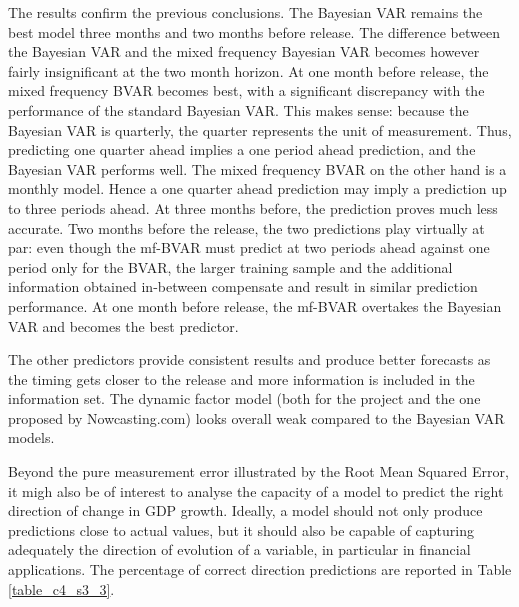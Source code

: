 The results confirm the previous conclusions. The Bayesian VAR remains the best model three months and two months before release. The difference between the Bayesian VAR and the mixed frequency Bayesian VAR becomes however fairly insignificant at the two month horizon. At one month before release, the mixed frequency BVAR becomes best, with a significant discrepancy with the performance of the standard Bayesian VAR. This makes sense: because the Bayesian VAR is quarterly, the quarter represents the unit of measurement. Thus, predicting one quarter ahead implies a one period ahead prediction, and the Bayesian VAR performs well. The mixed frequency BVAR on the other hand is a monthly model. Hence a one quarter ahead prediction may imply a prediction up to three periods ahead. At three months before, the prediction proves much less accurate. Two months before the release, the two predictions play virtually at par: even though the mf-BVAR must predict at two periods ahead against one period only for the BVAR, the larger training sample and the additional information obtained in-between compensate and result in similar prediction performance. At one month before release, the mf-BVAR overtakes the Bayesian VAR and becomes the best predictor.

The other predictors provide consistent results and produce better forecasts as the timing gets closer to the release and more information is included in the information set. The dynamic factor model (both for the project and the one proposed by Nowcasting.com) looks overall weak compared to the Bayesian VAR models.

Beyond the pure measurement error illustrated by the Root Mean Squared Error, it migh also be of interest to analyse the capacity of a model to predict the right direction of change in GDP growth. Ideally, a model should not only produce predictions close to actual values, but it should also be capable of capturing adequately the direction of evolution of a variable, in particular in financial applications. The percentage of correct direction predictions are reported in Table \ref{table_c4_s3_3}.

